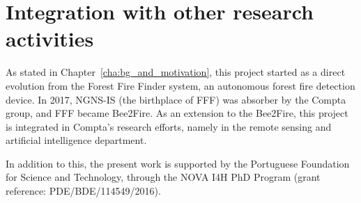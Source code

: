\section{Integration with other research activities}%
\label{sec:integration_with_other_research_activities}

As stated in Chapter~\ref{cha:bg_and_motivation}, this project started
as a direct evolution from the Forest Fire Finder system, an autonomous
forest fire detection device. In 2017, NGNS-IS (the birthplace of
\gls{FFF}) was absorber by the Compta group, and \gls{FFF} became
Bee2Fire. As an extension to the Bee2Fire, this project is integrated in
Compta's research efforts, namely in the remote sensing and artificial
intelligence department. 

In addition to this, the present work is supported by the Portuguese
Foundation for Science and Technology, through the NOVA I4H PhD Program
(grant reference: PDE/BDE/114549/2016).






